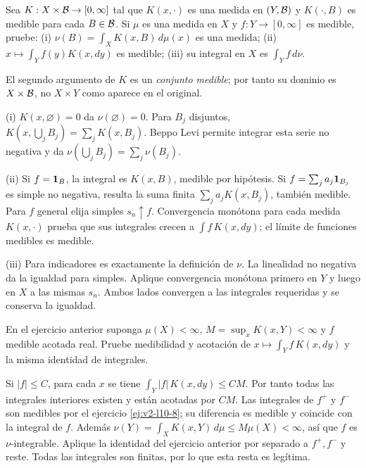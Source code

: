 \begin{ejercicio}\label{ej:v2-l10-8}
Sea $K:X\times\mathcal B\to[0,\infty]$ tal que $K(x,\cdot)$ es una medida en $(Y,\mathcal B)$ y $K(\cdot,B)$ es medible para cada $B\in\mathcal B$. Si $\mu$ es una medida en $X$ y $f:Y\to[0,\infty]$ es medible, pruebe: (i) $\nu(B)=\int_XK(x,B)\,d\mu(x)$ es una medida; (ii) $x\mapsto\int_Yf(y)K(x,dy)$ es medible; (iii) su integral en $X$ es $\int_Yf\,d\nu$.
\end{ejercicio}
\begin{solucion}
El segundo argumento de $K$ es un \emph{conjunto medible}; por tanto su dominio es $X\times\mathcal B$, no $X\times Y$ como aparece en el original.

(i) $K(x,\varnothing)=0$ da $\nu(\varnothing)=0$. Para $B_j$ disjuntos, $K(x,\bigcup_jB_j)=\sum_jK(x,B_j)$. Beppo Levi permite integrar esta serie no negativa y da $\nu(\bigcup_jB_j)=\sum_j\nu(B_j)$.

(ii) Si $f=\mathbf1_{B}$, la integral es $K(x,B)$, medible por hipótesis. Si $f=\sum_ja_j\mathbf1_{B_j}$ es simple no negativa, resulta la suma finita $\sum_ja_jK(x,B_j)$, también medible. Para $f$ general elija simples $s_n\uparrow f$. Convergencia monótona para cada medida $K(x,\cdot)$ prueba que sus integrales crecen a $\int f\,K(x,dy)$; el límite de funciones medibles es medible.

(iii) Para indicadores es exactamente la definición de $\nu$. La linealidad no negativa da la igualdad para simples. Aplique convergencia monótona primero en $Y$ y luego en $X$ a las mismas $s_n$. Ambos lados convergen a las integrales requeridas y se conserva la igualdad.
\end{solucion}

\begin{ejercicio}\label{ej:v2-l10-9}
En el ejercicio anterior suponga $\mu(X)<\infty$, $M=\sup_xK(x,Y)<\infty$ y $f$ medible acotada real. Pruebe medibilidad y acotación de $x\mapsto\int_Yf\,K(x,dy)$ y la misma identidad de integrales.
\end{ejercicio}
\begin{solucion}
Si $|f|\le C$, para cada $x$ se tiene $\int_Y|f|\,K(x,dy)\le CM$. Por tanto todas las integrales interiores existen y están acotadas por $CM$. Las integrales de $f^+$ y $f^-$ son medibles por el ejercicio \ref{ej:v2-l10-8}; su diferencia es medible y coincide con la integral de $f$. Además $\nu(Y)=\int_XK(x,Y)\,d\mu\le M\mu(X)<\infty$, así que $f$ es $\nu$-integrable. Aplique la identidad del ejercicio anterior por separado a $f^+,f^-$ y reste. Todas las integrales son finitas, por lo que esta resta es legítima.
\end{solucion}

